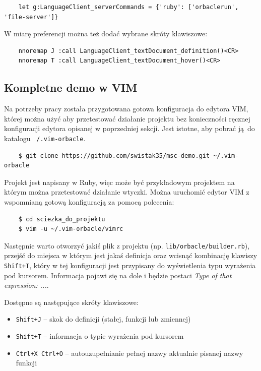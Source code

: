 \documentclass[shortabstract,mgr]{iithesis}
\begin{document}
\begin{appendices}
\begin{lstlisting}
    let g:LanguageClient_serverCommands = {'ruby': ['orbaclerun', 'file-server']}
\end{lstlisting}

W miarę preferencji można też dodać wybrane skróty klawiszowe:

\begin{lstlisting}
    nnoremap J :call LanguageClient_textDocument_definition()<CR>
    nnoremap T :call LanguageClient_textDocument_hover()<CR>
\end{lstlisting}

\subsection{Kompletne demo w VIM}

Na potrzeby pracy została przygotowana gotowa konfiguracja do edytora VIM, której można użyć aby przetestować działanie projektu bez konieczności ręcznej konfiguracji edytora opisanej w poprzedniej sekcji. Jest istotne, aby pobrać ją do katalogu \texttt{~/.vim-orbacle}.

\begin{lstlisting}
    $ git clone https://github.com/swistak35/msc-demo.git ~/.vim-orbacle
\end{lstlisting}

Projekt jest napisany w Ruby, więc może być przykładowym projektem na którym można przetestować działanie wtyczki. Można uruchomić edytor VIM z wspomnianą gotową konfiguracją za pomocą polecenia:

\begin{lstlisting}
    $ cd sciezka_do_projektu
    $ vim -u ~/.vim-orbacle/vimrc
\end{lstlisting}

Następnie warto otworzyć jakiś plik z projektu (np. \texttt{lib/orbacle/builder.rb}), przejść do miejsca w którym jest jakaś definicja oraz wcisnąć kombinację klawiszy \texttt{Shift+T}, który w tej konfiguracji jest przypisany do wyświetlenia typu wyrażenia pod kursorem. Informacja pojawi się na dole i będzie postaci \textit{Type of that expression: ...}.

Dostępne są następujące skróty klawiszowe:

\begin{itemize}
\item \texttt{Shift+J} -- skok do definicji (stałej, funkcji lub zmiennej)
\item \texttt{Shift+T} -- informacja o typie wyrażenia pod kursorem
\item \texttt{Ctrl+X Ctrl+O} -- autouzupełnianie pełnej nazwy aktualnie pisanej nazwy funkcji
\end{itemize}



\end{appendices}
\end{document}
